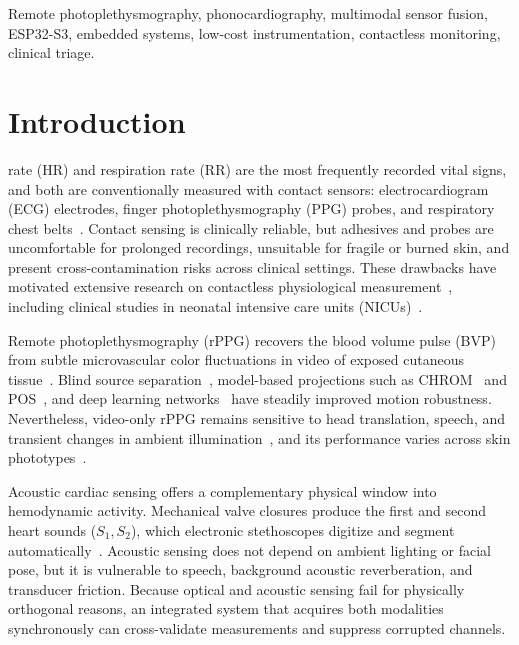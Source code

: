\documentclass[journal]{IEEEtran}
\begin{document}
\begin{IEEEkeywords}
Remote photoplethysmography, phonocardiography, multimodal sensor fusion, ESP32-S3, embedded systems, low-cost instrumentation, contactless monitoring, clinical triage.
\end{IEEEkeywords}

\section{Introduction}
\label{sec:intro}

 rate (HR) and respiration rate (RR) are the most frequently recorded vital signs, and both are conventionally measured with contact sensors: electrocardiogram (ECG) electrodes, finger photoplethysmography (PPG) probes, and respiratory chest belts~\cite{allen2007ppg}. Contact sensing is clinically reliable, but adhesives and probes are uncomfortable for prolonged recordings, unsuitable for fragile or burned skin, and present cross-contamination risks across clinical settings. These drawbacks have motivated extensive research on contactless physiological measurement~\cite{mcduff2023survey}, including clinical studies in neonatal intensive care units (NICUs)~\cite{villarroel2019nicu}.

Remote photoplethysmography (rPPG) recovers the blood volume pulse (BVP) from subtle microvascular color fluctuations in video of exposed cutaneous tissue~\cite{verkruysse2008}. Blind source separation~\cite{poh2010}, model-based projections such as CHROM~\cite{dehaan2013chrom} and POS~\cite{wang2017pos}, and deep learning networks~\cite{chen2018deepphys,yu2019physnet,liu2023toolbox} have steadily improved motion robustness. Nevertheless, video-only rPPG remains sensitive to head translation, speech, and transient changes in ambient illumination~\cite{li2014cvpr,tarassenko2014}, and its performance varies across skin phototypes~\cite{nowara2020skin}.

Acoustic cardiac sensing offers a complementary physical window into hemodynamic activity. Mechanical valve closures produce the first and second heart sounds ($S_1, S_2$), which electronic stethoscopes digitize and segment automatically~\cite{leng2015stethoscope,liang1997envelogram,springer2016hsmm}. Acoustic sensing does not depend on ambient lighting or facial pose, but it is vulnerable to speech, background acoustic reverberation, and transducer friction. Because optical and acoustic sensing fail for physically orthogonal reasons, an integrated system that acquires both modalities synchronously can cross-validate measurements and suppress corrupted channels.
\end{document}
